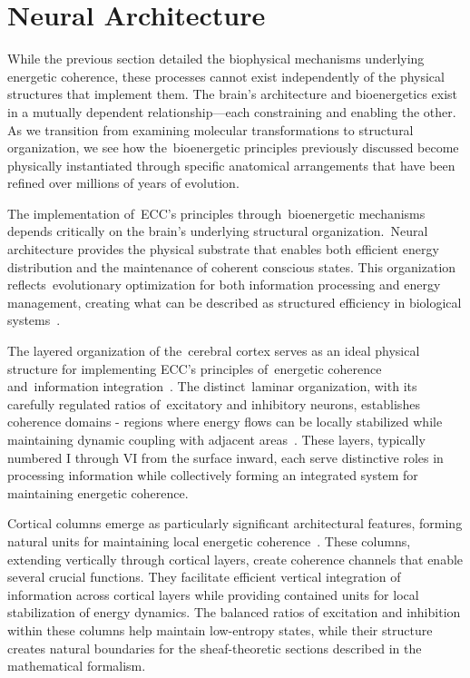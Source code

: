 \section{Neural Architecture~}

While the previous section detailed the biophysical mechanisms underlying energetic coherence, these processes cannot exist independently of the physical structures that implement them. The brain's architecture and bioenergetics exist in a mutually dependent relationship—each constraining and enabling the other. As we transition from examining molecular transformations to structural organization, we see how the~bioenergetic principles previously discussed become physically instantiated through specific anatomical arrangements that have been refined over millions of years of evolution.

The implementation of~ECC's principles through~bioenergetic mechanisms depends critically on the brain's underlying structural organization.~Neural architecture provides the physical substrate that enables both efficient energy distribution and the maintenance of coherent conscious states. This organization reflects~evolutionary optimization for both information processing and energy management, creating what can be described as structured efficiency in biological systems~\cite{Hilgetag2020, bullmore2012economy}.

The layered organization of the~cerebral cortex serves as an ideal physical structure for implementing ECC's principles of~energetic coherence and~information integration~\cite{Douglas2004, Amunts2015}. The distinct~laminar organization, with its carefully regulated ratios of~excitatory and inhibitory neurons, establishes coherence domains - regions where energy flows can be locally stabilized while maintaining dynamic coupling with adjacent areas~\cite{Harris2015, Froemke2015}. These layers, typically numbered I through VI from the surface inward, each serve distinctive roles in processing information while collectively forming an integrated system for maintaining energetic coherence.

Cortical columns emerge as particularly significant architectural features, forming natural units for maintaining local energetic coherence~\cite{Mountcastle1997, Amunts2007}. These columns, extending vertically through cortical layers, create coherence channels that enable several crucial functions. They facilitate efficient vertical integration of information across cortical layers while providing contained units for local stabilization of energy dynamics. The balanced ratios of excitation and inhibition within these columns help maintain low-entropy states, while their structure creates natural boundaries for the sheaf-theoretic sections described in the mathematical formalism.


